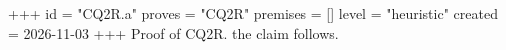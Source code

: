 +++
id = "CQ2R.a"
proves = "CQ2R"
premises = []
level = "heuristic"
created = 2026-11-03
+++
Proof of CQ2R. the claim follows.
